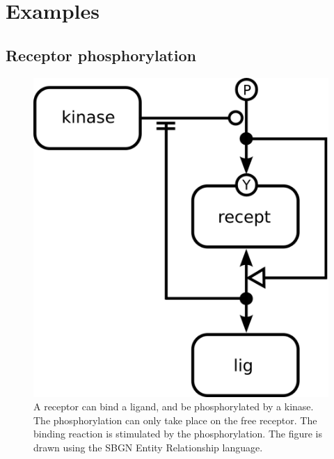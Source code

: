 \chapter{Examples}

\section{Receptor phosphorylation}

\begin{figure}[H]
\begin{center}
\includegraphics{figs/pngs/example_phospho_receptor.png}
\caption{A receptor can bind a ligand, and be phosphorylated by a kinase. The phosphorylation can only take place on the free receptor. The binding reaction is stimulated by the phosphorylation. The figure is drawn using the SBGN Entity Relationship language.}
\label{fig:receptor}
\end{center}
\end{figure}

